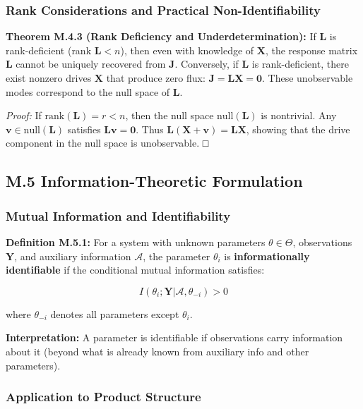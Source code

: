 \documentclass[
]{article}
\begin{document}
\subsubsection{Rank Considerations and Practical
Non-Identifiability}\label{rank-considerations-and-practical-non-identifiability}

\textbf{Theorem M.4.3 (Rank Deficiency and Underdetermination):} If
\(\mathbf{L}\) is rank-deficient (rank \(\mathbf{L} < n\)), then even
with knowledge of \(\mathbf{X}\), the response matrix \(\mathbf{L}\)
cannot be uniquely recovered from \(\mathbf{J}\). Conversely, if
\(\mathbf{L}\) is rank-deficient, there exist nonzero drives
\(\mathbf{X}\) that produce zero flux:
\(\mathbf{J} = \mathbf{L} \mathbf{X} = \mathbf{0}\). These unobservable
modes correspond to the null space of \(\mathbf{L}\).

\emph{Proof:} If \(\text{rank}(\mathbf{L}) = r < n\), then the null
space \(\text{null}(\mathbf{L})\) is nontrivial. Any
\(\mathbf{v} \in \text{null}(\mathbf{L})\) satisfies
\(\mathbf{L} \mathbf{v} = \mathbf{0}\). Thus
\(\mathbf{L}(\mathbf{X} + \mathbf{v}) = \mathbf{L} \mathbf{X}\), showing
that the drive component in the null space is unobservable. □

\subsection{M.5 Information-Theoretic
Formulation}\label{m.5-information-theoretic-formulation}

\subsubsection{Mutual Information and
Identifiability}\label{mutual-information-and-identifiability}

\textbf{Definition M.5.1:} For a system with unknown parameters
\(\theta \in \Theta\), observations \(\mathbf{Y}\), and auxiliary
information \(\mathcal{A}\), the parameter \(\theta_i\) is
\textbf{informationally identifiable} if the conditional mutual
information satisfies:

\[I(\theta_i; \mathbf{Y} | \mathcal{A}, \theta_{-i}) > 0\]

where \(\theta_{-i}\) denotes all parameters except \(\theta_i\).

\textbf{Interpretation:} A parameter is identifiable if observations
carry information about it (beyond what is already known from auxiliary
info and other parameters).

\subsubsection{Application to Product
Structure}\label{application-to-product-structure}
\end{document}
